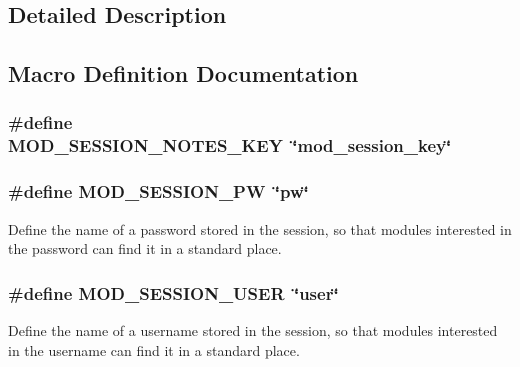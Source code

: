 \subsection{Detailed Description}


\subsection{Macro Definition Documentation}
\subsubsection[{\texorpdfstring{M\+O\+D\+\_\+\+S\+E\+S\+S\+I\+O\+N\+\_\+\+N\+O\+T\+E\+S\+\_\+\+K\+EY}{MOD_SESSION_NOTES_KEY}}]{\setlength{\rightskip}{0pt plus 5cm}\#define M\+O\+D\+\_\+\+S\+E\+S\+S\+I\+O\+N\+\_\+\+N\+O\+T\+E\+S\+\_\+\+K\+EY~\char`\"{}mod\+\_\+session\+\_\+key\char`\"{}}\hypertarget{group__MOD__SESSION_ga61002f89881b278472205a93205c1c88}{}\label{group__MOD__SESSION_ga61002f89881b278472205a93205c1c88}
\subsubsection[{\texorpdfstring{M\+O\+D\+\_\+\+S\+E\+S\+S\+I\+O\+N\+\_\+\+PW}{MOD_SESSION_PW}}]{\setlength{\rightskip}{0pt plus 5cm}\#define M\+O\+D\+\_\+\+S\+E\+S\+S\+I\+O\+N\+\_\+\+PW~\char`\"{}pw\char`\"{}}\hypertarget{group__MOD__SESSION_gab8f2aeb85b50c2ab8a560dfbcd4dbe55}{}\label{group__MOD__SESSION_gab8f2aeb85b50c2ab8a560dfbcd4dbe55}
Define the name of a password stored in the session, so that modules interested in the password can find it in a standard place. 
\subsubsection[{\texorpdfstring{M\+O\+D\+\_\+\+S\+E\+S\+S\+I\+O\+N\+\_\+\+U\+S\+ER}{MOD_SESSION_USER}}]{\setlength{\rightskip}{0pt plus 5cm}\#define M\+O\+D\+\_\+\+S\+E\+S\+S\+I\+O\+N\+\_\+\+U\+S\+ER~\char`\"{}user\char`\"{}}\hypertarget{group__MOD__SESSION_ga5d6504ca778c088139a2f5c622350f15}{}\label{group__MOD__SESSION_ga5d6504ca778c088139a2f5c622350f15}
Define the name of a username stored in the session, so that modules interested in the username can find it in a standard place. 

